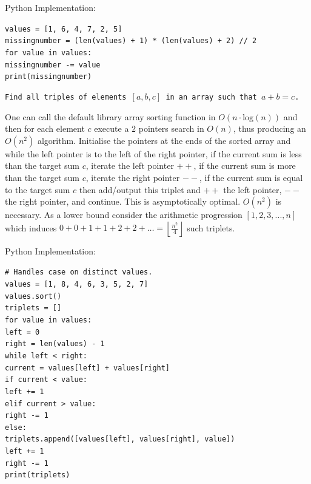 Python Implementation:

\texttt{values = [1, 6, 4, 7, 2, 5]} \\
\texttt{missingnumber = (len(values) + 1) * (len(values) + 2) // 2} \\
\texttt{for value in values:} \\
\phantom{xxxx}\texttt{missingnumber -= value} \\
\texttt{print(missingnumber)}

\texttt{Find all triples of elements $[a,b,c]$ in an array such that $a+b=c$.}

One can call the default library array sorting function in $O(n \cdot \text{log}(n))$ and then for each element $c$ execute a $2$ pointers search in $O(n)$, thus producing an $O(n^2)$ algorithm. Initialise the pointers at the ends of the sorted array and while the left pointer is to the left of the right pointer, if the current sum is less than the target sum $c$, iterate the left pointer $++$, if the current sum is more than the target sum $c$, iterate the right pointer $--$, if the current sum is equal to the target sum $c$ then add/output this triplet and $++$ the left pointer, $--$ the right pointer, and continue. This is asymptotically optimal. $O(n^2)$ is necessary. As a lower bound consider the arithmetic progression $[1,2,3,...,n]$ which induces $0+0+1+1+2+2+\dots = \left \lfloor \frac{n^2}{4} \right \rfloor$ such triplets.

Python Implementation:

\texttt{\# Handles case on distinct values.} \\
\texttt{values = [1, 8, 4, 6, 3, 5, 2, 7]} \\
\texttt{values.sort()} \\
\texttt{triplets = []} \\
\texttt{for value in values:} \\
\phantom{xxxx}\texttt{left = 0} \\
\phantom{xxxx}\texttt{right = len(values) - 1} \\
\phantom{xxxx}\texttt{while left < right:} \\
\phantom{xxxxxxxx}\texttt{current = values[left] + values[right]} \\
\phantom{xxxxxxxx}\texttt{if current < value:} \\
\phantom{xxxxxxxxxxxx}\texttt{left += 1} \\
\phantom{xxxxxxxx}\texttt{elif current > value:} \\
\phantom{xxxxxxxxxxxx}\texttt{right -= 1} \\
\phantom{xxxxxxxx}\texttt{else:} \\
\phantom{xxxxxxxxxxxx}\texttt{triplets.append([values[left], values[right], value])} \\
\phantom{xxxxxxxxxxxx}\texttt{left += 1} \\
\phantom{xxxxxxxxxxxx}\texttt{right -= 1} \\
\texttt{print(triplets)}

